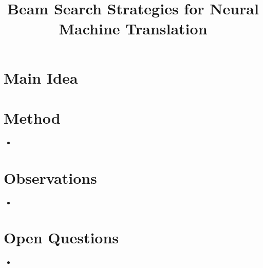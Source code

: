 \documentclass[12pt]{scrartcl}
\begin{document}
\title{Beam Search Strategies for Neural Machine Translation}
\author{}
\date{}
\maketitle

\section{Main Idea}

\section{Method}
  \begin{itemize}
    \item 
  \end{itemize}

\section{Observations}
  \begin{itemize}
    \item 
  \end{itemize}

\section{Open Questions}
  \begin{itemize}
    \item 
  \end{itemize}



\end{document}
